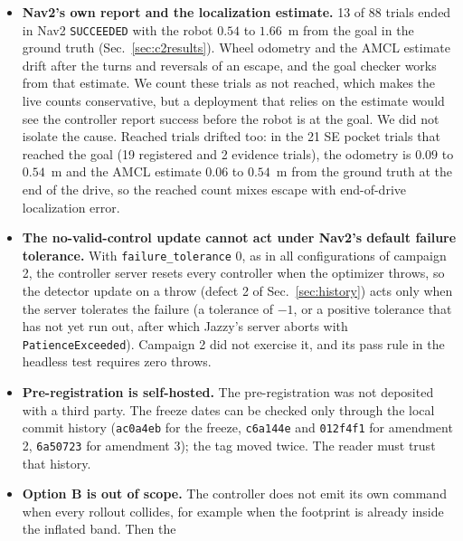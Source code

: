 \documentclass[journal]{IEEEtran}
\begin{document}
\begin{itemize}
  development family and is not decision-bearing; its result (4 of 6 against 0 of 6,
  $p=0.0606$) is not significant. The claim of transfer rests on one pocket, \texttt{s4\_ltrap},
  which lies outside the family by depth (by $0.20$~m, 11 percent) and shape but inside its
  span in width and rotation. One pocket shows that the controller escaped a geometry that the
  design did not see; it does not show that it does so for pockets in general.
\item \textbf{Nav2's own report and the localization estimate.} 13 of 88 trials ended in Nav2
  \texttt{SUCCEEDED} with the robot $0.54$ to $1.66$~m from the goal in the ground truth
  (Sec.~\ref{sec:c2results}). Wheel odometry and the AMCL estimate drift after the turns and
  reversals of an escape, and the goal checker works from that estimate. We count these trials as not reached,
  which makes the live counts conservative, but a deployment that relies on the estimate would
  see the controller report success before the robot is at the goal. We did not isolate the cause.
  Reached trials drifted too: in the 21 SE pocket trials that reached the goal (19 registered
  and 2 evidence trials), the odometry is
  $0.09$ to $0.54$~m and the AMCL estimate $0.06$ to $0.54$~m from the ground truth at the end of
  the drive, so the reached count mixes escape with end-of-drive localization error.
\item \textbf{The no-valid-control update cannot act under Nav2's default failure tolerance.} With
  \texttt{failure\_tolerance} $0$, as in all configurations of campaign 2, the controller server resets every
  controller when the optimizer throws, so the detector update on a throw (defect 2 of
  Sec.~\ref{sec:history}) acts only when the server tolerates the failure (a tolerance of $-1$, or a
  positive tolerance that has not yet run out, after which Jazzy's server aborts with
  \texttt{PatienceExceeded}). Campaign 2 did not exercise it, and
  its pass rule in the headless test requires zero throws.
\item \textbf{Pre-registration is self-hosted.} The pre-registration was not deposited with a
  third party. The freeze dates can be checked only through the local commit history
  (\texttt{ac0a4eb} for the freeze, \texttt{c6a144e} and \texttt{012f4f1} for amendment 2,
  \texttt{6a50723} for amendment 3); the tag moved twice. The reader must trust that history.
\item \textbf{Option B is out of scope.} The controller does not emit its own command when
  every rollout collides, for example when the footprint is already inside the inflated band. Then the

\end{itemize}
\end{document}
